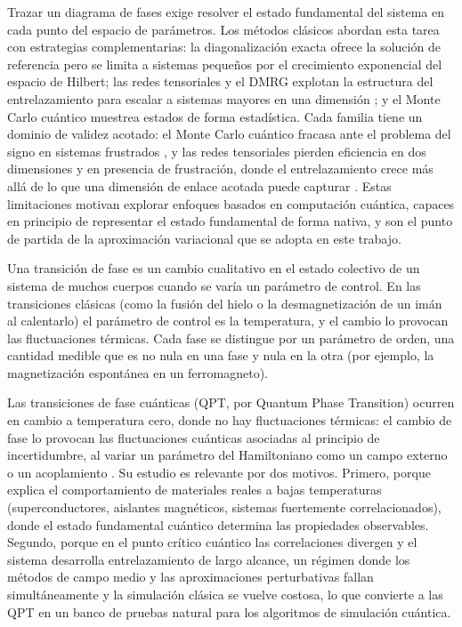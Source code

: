 \documentclass[11pt,a4paper,spanish]{book}
\begin{document}
Trazar un diagrama de fases exige resolver el estado fundamental del sistema en cada punto del espacio de parámetros. Los métodos clásicos abordan esta tarea con estrategias complementarias: la diagonalización exacta ofrece la solución de referencia pero se limita a sistemas pequeños por el crecimiento exponencial del espacio de Hilbert; las redes tensoriales y el DMRG explotan la estructura del entrelazamiento para escalar a sistemas mayores en una dimensión \citep{schollwock2011}; y el Monte Carlo cuántico muestrea estados de forma estadística. Cada familia tiene un dominio de validez acotado: el Monte Carlo cuántico fracasa ante el problema del signo en sistemas frustrados \citep{troyer2005}, y las redes tensoriales pierden eficiencia en dos dimensiones y en presencia de frustración, donde el entrelazamiento crece más allá de lo que una dimensión de enlace acotada puede capturar \citep{ahsan2025}. Estas limitaciones motivan explorar enfoques basados en computación cuántica, capaces en principio de representar el estado fundamental de forma nativa, y son el punto de partida de la aproximación variacional que se adopta en este trabajo.

Una transición de fase es un cambio cualitativo en el estado colectivo de un sistema de muchos cuerpos cuando se varía un parámetro de control. En las transiciones clásicas (como la fusión del hielo o la desmagnetización de un imán al calentarlo) el parámetro de control es la temperatura, y el cambio lo provocan las fluctuaciones térmicas. Cada fase se distingue por un parámetro de orden, una cantidad medible que es no nula en una fase y nula en la otra (por ejemplo, la magnetización espontánea en un ferromagneto).

Las transiciones de fase cuánticas (QPT, por Quantum Phase Transition) ocurren en cambio a temperatura cero, donde no hay fluctuaciones térmicas: el cambio de fase lo provocan las fluctuaciones cuánticas asociadas al principio de incertidumbre, al variar un parámetro del Hamiltoniano como un campo externo o un acoplamiento \citep{dutta2015, sachdev2011}. Su estudio es relevante por dos motivos. Primero, porque explica el comportamiento de materiales reales a bajas temperaturas (superconductores, aislantes magnéticos, sistemas fuertemente correlacionados), donde el estado fundamental cuántico determina las propiedades observables. Segundo, porque en el punto crítico cuántico las correlaciones divergen y el sistema desarrolla entrelazamiento de largo alcance, un régimen donde los métodos de campo medio y las aproximaciones perturbativas fallan simultáneamente y la simulación clásica se vuelve costosa, lo que convierte a las QPT en un banco de pruebas natural para los algoritmos de simulación cuántica.
\end{document}
